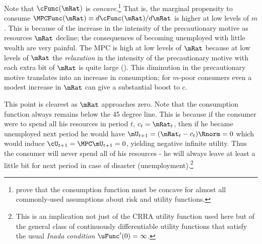 \documentclass{handout}
\begin{document}
Note that $\cFunc(\mRat)$ is {\it concave}.\footnote{\cite{carroll&kimball:concavity} prove that the consumption
function must be concave for almost all commonly-used assumptions about
risk and utility functions.} That is, the marginal propensity to
consume $\MPCFunc(\mRat) \equiv d \cFunc(\mRat)/d \mRat$ is higher at low levels of $m$.  This is because
of the increase in the intensity of the precautionary motive as resources
$\mRat$ decline; the consequences of becoming unemployed with little wealth are very painful.  The MPC is high at low
levels of $\mRat$ because at low levels of $\mRat$ the {\it relaxation} in the
intensity of the precautionary motive with each extra bit of $\mRat$ is quite large (\cite{kimball:smallandlarge}).
This diminution in the precautionary motive translates into an increase
in consumption; for $m$-poor consumers even a modest increase in $\mRat$ can
give a substantial boost to $c$.

This point is clearest as $\mRat$ approaches zero.  Note that the
consumption function always remains below the 45 degree line.  This
is because if the consumer were to spend all his resources in
period $t$, $c_{t}=\mRat_{t}$, then if he became unemployed next
period he would have $\mU_{t+1}=(\mRat_{t}-c_{t})\Rnorm=0$ which
would induce $\cU_{t+1}= \MPCU \mU_{t+1}=0$, yielding negative
infinite utility.  Thus the consumer will never spend all of his
resources - he will always leave at least a little bit for next period
in case of disaster (unemployment).\footnote{This is an implication not just
of the CRRA utility function used here but of the general class of continuously differentiable utility
functions that satisfy the usual {\it Inada condition} $\uFunc^{\prime}(0) = \infty$.}
\end{document}
